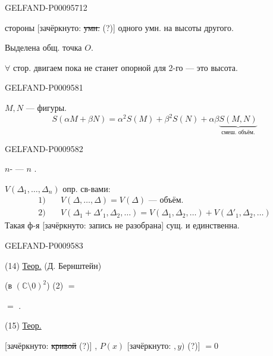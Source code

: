\begin{GelfandAdjacentEvidence}{GELFAND-P000957}{12}


стороны [зачёркнуто: \sout{умн.} (?)] одного умн. на высоты другого.
\end{GelfandAdjacentEvidence}


Выделена общ. точка $O$.

$\forall$ стор. двигаем пока не станет опорной для 2-го --- это высота.

\begin{GelfandAdjacentEvidence}{GELFAND-P000958}{1}


$M,N$ --- фигуры.
\[
 S(\alpha M+\beta N)=\alpha^2S(M)+\beta^2S(N)+
 \alpha\beta\underbrace{S(M,N)}_{\text{смеш. объём.}}
\]
\end{GelfandAdjacentEvidence}
\begin{GelfandAdjacentEvidence}{GELFAND-P000958}{2}


 $n$- ---  $n$ .

$V(\Delta_1,\ldots,\Delta_n)$ опр. св-вами:
\begin{align*}
 1)\quad &V(\Delta,\ldots,\Delta)=V(\Delta)\text{ --- объём.}\\
 2)\quad &V(\Delta_1+\Delta'_1,\Delta_2,\ldots)
  =V(\Delta_1,\Delta_2,\ldots)+V(\Delta'_1,\Delta_2,\ldots)
\end{align*}
Такая ф-я [зачёркнуто: запись не разобрана] сущ. и единственна.
\end{GelfandAdjacentEvidence}
\begin{GelfandAdjacentEvidence}{GELFAND-P000958}{3}


(14) \underline{Теор.} (Д. Бернштейн)

 (в $(\mathbb C\setminus0)^2$)   (2) $=$

$=$ .

(15) \underline{Теор.}

 [зачёркнуто: \sout{кривой} (?)] ,
$P(x)$ [зачёркнуто: \(,y)\) (?)] \( {}=0 \)
\end{GelfandAdjacentEvidence}
